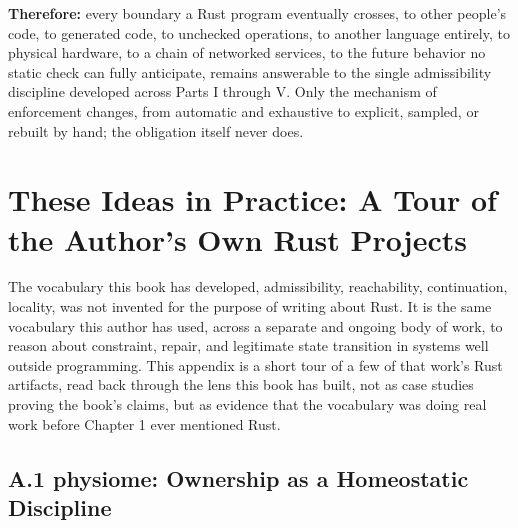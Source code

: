 \documentclass[11pt]{book}
\begin{document}
\noindent\textbf{Therefore:} every boundary a Rust program eventually crosses, to other people's code, to generated code, to unchecked operations, to another language entirely, to physical hardware, to a chain of networked services, to the future behavior no static check can fully anticipate, remains answerable to the single admissibility discipline developed across Parts I through V. Only the mechanism of enforcement changes, from automatic and exhaustive to explicit, sampled, or rebuilt by hand; the obligation itself never does.



\clearpage

\appendix
\chapter[These Ideas in Practice]{These Ideas in Practice: A Tour of the Author's Own Rust Projects}

The vocabulary this book has developed, admissibility, reachability, continuation, locality, was not invented for the purpose of writing about Rust. It is the same vocabulary this author has used, across a separate and ongoing body of work, to reason about constraint, repair, and legitimate state transition in systems well outside programming. This appendix is a short tour of a few of that work's Rust artifacts, read back through the lens this book has built, not as case studies proving the book's claims, but as evidence that the vocabulary was doing real work before Chapter 1 ever mentioned Rust.

\section*{A.1 physiome: Ownership as a Homeostatic Discipline}
\end{document}
